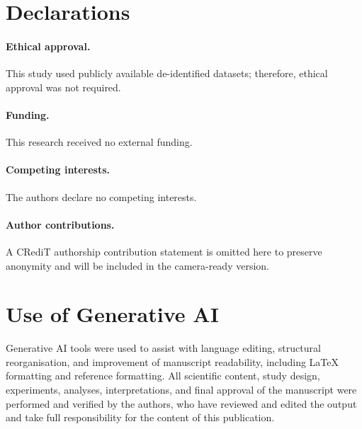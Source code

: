 
\section*{Declarations}

\paragraph{Ethical approval.} This study used publicly available de-identified datasets; therefore, ethical approval was not required.

\paragraph{Funding.} This research received no external funding.

\paragraph{Competing interests.} The authors declare no competing interests.

\paragraph{Author contributions.} A CRediT authorship contribution statement is omitted here to preserve anonymity and will be included in the camera-ready version.

\section*{Use of Generative AI}

Generative AI tools were used to assist with language editing, structural reorganisation, and improvement of manuscript readability, including LaTeX formatting and reference formatting. All scientific content, study design, experiments, analyses, interpretations, and final approval of the manuscript were performed and verified by the authors, who have reviewed and edited the output and take full responsibility for the content of this publication.

